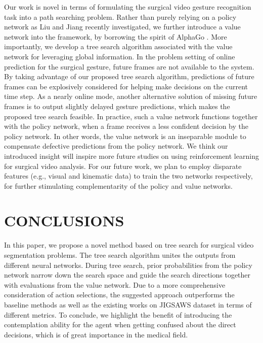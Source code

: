 \documentclass[letterpaper, 10 pt, conference]{ieeeconf}
\begin{document}
Our work is novel in terms of formulating the surgical video gesture recognition task into a path searching problem. Rather than purely relying on a policy network as Liu and Jiang \cite{liu2018deep} recently investigated, we further introduce a value network into the framework, by borrowing the spirit of AlphaGo \cite{silver2016mastering,silver2017mastering}. More importantly, we develop a tree search algorithm associated with the value network for leveraging global information. In the problem setting of online prediction for the surgical gesture, future frames are not available to the system. By taking advantage of our proposed tree search algorithm, predictions of future frames can be explosively considered for helping make decisions on the current time step. As a nearly online mode, another alternative solution of missing future frames is to output slightly delayed gesture predictions, which makes the proposed tree search feasible.
In practice, such a value network functions together with the policy network, when a frame receives a less confident decision by the policy network. In other words, the value network is an inseparable module to compensate defective predictions from the policy network. We think our introduced insight will inspire more future studies on using reinforcement learning for surgical video analysis. For our future work, we plan to employ disparate features (e.g., visual and kinematic data) to train the two networks respectively, for further stimulating complementarity of the policy and value networks.

\section{CONCLUSIONS}
\label{CONCLUSIONS}	
In this paper, we propose a novel method based on tree search for surgical video segmentation problems. The tree search algorithm unites the outputs from different neural networks. During tree search, prior probabilities from the policy network narrow down the search space and guide the search directions together with evaluations from the value network. Due to a more comprehensive consideration of action selections, the suggested approach outperforms the baseline methods as well as the existing works on JIGSAWS dataset in terms of different metrics. To conclude, we highlight the benefit of introducing the contemplation ability for the agent when getting confused about the direct decisions, which is of great importance in the medical field.
	






\newpage
	


	

	
	
	
	
\end{document}
